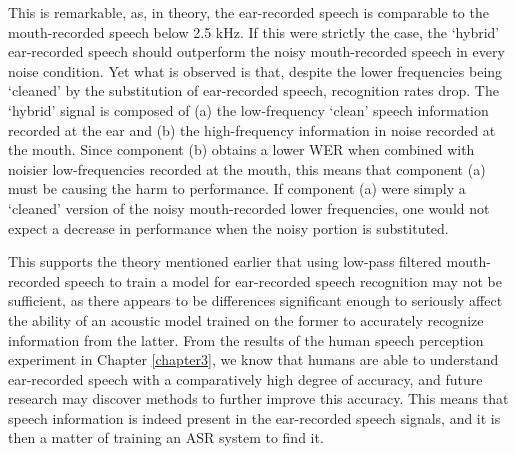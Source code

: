 This is remarkable, as, in theory, the ear-recorded speech is comparable to the mouth-recorded speech below 2.5 kHz.  If this were strictly the case, the `hybrid' ear-recorded speech should outperform the noisy mouth-recorded speech in every noise condition.  Yet what is observed is that, despite the lower frequencies being `cleaned' by the substitution of ear-recorded speech, recognition rates drop.  The `hybrid' signal is composed of (a) the low-frequency `clean' speech information recorded at the ear and (b) the high-frequency information in noise recorded at the mouth.  Since component (b) obtains a lower WER when combined with noisier low-frequencies recorded at the mouth, this means that component (a) must be causing the harm to performance.  If component (a) were simply a `cleaned' version of the noisy mouth-recorded lower frequencies, one would not expect a decrease in performance when the noisy portion is substituted.

This supports the theory mentioned earlier that using low-pass filtered mouth-recorded speech to train a model for ear-recorded speech recognition may not be sufficient, as there appears to be differences significant enough to seriously affect the ability of an acoustic model trained on the former to accurately recognize information from the latter.  From the results of the human speech perception experiment in Chapter \ref{chapter3}, we know that humans are able to understand ear-recorded speech with a comparatively high degree of accuracy, and future research may discover methods to further improve this accuracy.  This means that speech information is indeed present in the ear-recorded speech signals, and it is then a matter of training an ASR system to find it.


